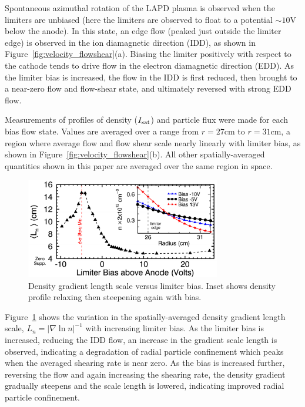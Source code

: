 \documentclass[aps,prl,amsmath,amssymb,preprint,superscriptaddress]{revtex4}
\begin{document}
Spontaneous azimuthal rotation of the LAPD plasma is observed when the limiters are
unbiased (here the limiters are observed to float to a
potential $\sim 10$V below the anode).  In this state, an edge flow
(peaked just outside the limiter edge) is
observed in the ion diamagnetic direction (IDD), as shown in
Figure~\ref{fig:velocity_flowshear}(a).  Biasing the limiter positively
with respect to the cathode tends to drive flow in the electron
diamagnetic direction (EDD).  As the limiter bias is increased, the
flow in the IDD is first reduced, then brought to a near-zero flow
and flow-shear state, and ultimately reversed with strong EDD flow.

Measurements of profiles of density ($I_{\rm sat}$) and particle flux
were made for each bias flow state. Values are averaged over a range
from $r=27$cm to $r=31$cm, a region where average flow and flow shear scale
nearly linearly with limiter bias, as shown in
Figure~\ref{fig:velocity_flowshear}(b).  All other spatially-averaged
quantities shown in this paper are averaged over the same region in space.

\begin{figure}[!htbp]
\centerline{
\includegraphics[width=8.5cm]{densgrad.pdf}}
\caption{\label{fig:densgrad} Density gradient length scale versus limiter bias. Inset shows density profile relaxing then steepening again with bias.}
\end{figure}

Figure~\ref{fig:densgrad} shows the variation in the spatially-averaged density gradient length scale, $L_{n} = \lvert \nabla \ln n \rvert ^{-1}$ with
increasing limiter bias.  As the limiter bias is increased, reducing
the IDD flow, an increase in the gradient scale length is observed,
indicating a degradation of radial particle confinement which peaks
when the averaged shearing rate is near zero. As the bias is
increased further, reversing the flow and again increasing the
shearing rate, the density gradient gradually steepens and the
scale length is lowered, indicating improved radial particle confinement.  
\end{document}
